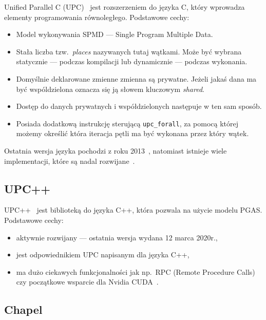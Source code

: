 \documentclass[twocolumn]{article}
\begin{document}
Unified Parallel C (UPC)~\cite{upc} jest rozszerzeniem do języka C,
który wprowadza elementy programowania równoległego.
Podstawowe cechy:
\begin{itemize}
    \item Model wykonywania SPMD --- Single Program Multiple Data.
    \item Stała liczba tzw.\ \textit{places} nazywanych tutaj wątkami.
    Może być wybrana statycznie --- podczas kompilacji lub dynamicznie --- podczas wykonania.
    \item Domyślnie deklarowane zmienne zmienna są prywatne.
    Jeżeli jakaś dana ma być wspóldzielona oznacza się ją słowem kluczowym \textit{shared}.
    \item Dostęp do danych prywatnych i współdzielonych następuje w ten sam sposób.
    \item Posiada dodatkową instrukcję sterującą \texttt{upc\_forall}, za pomocą której
    możemy określić która iteracja pętli ma być wykonana przez który wątek.
\end{itemize}

Ostatnia wersja języka pochodzi z roku 2013~\cite{upc},
natomiast istnieje wiele implementacji, które są nadal
rozwijane~\cite{berkleyupc, upc_clang}.

\subsection{UPC++}

UPC++~\cite{upcxx} jest biblioteką do języka C++, która
pozwala na użycie modelu PGAS.
Podstawowe cechy:
\begin{itemize}
    \item aktywnie rozwijany --- ostatnia wersja wydana 12 marca 2020r.,
    \item jest odpowiednikiem UPC napisanym dla języka C++,
    \item ma dużo ciekawych funkcjonalności jak np.\ RPC (Remote Procedure Calls)
    czy początkowe wsparcie dla Nvidia CUDA~\cite{upcpp}.
\end{itemize}

\subsection{Chapel}
\end{document}

